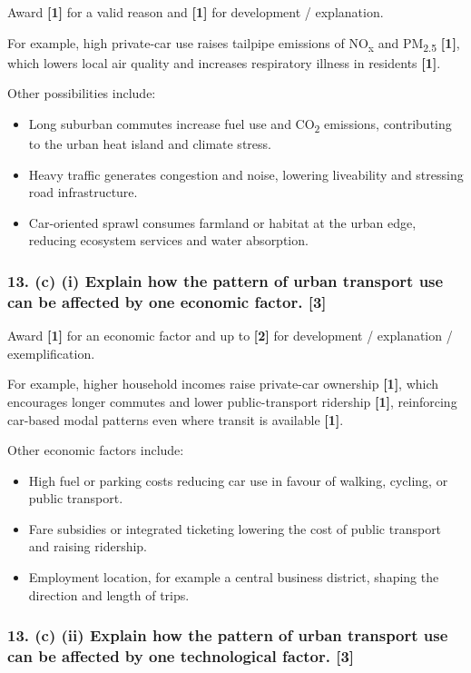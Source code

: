 \documentclass[11pt,a4paper]{article}
\newcommand{\term}[1]{\textbf{#1}}
\begin{document}
Award \term{[1]} for a valid reason and \term{[1]} for development /
explanation.

For example, high private-car use raises tailpipe emissions of
NO\textsubscript{x} and PM\textsubscript{2.5} \term{[1]}, which lowers local
air quality and increases respiratory illness in residents \term{[1]}.

Other possibilities include:
\begin{itemize}
  \item Long suburban commutes increase fuel use and CO\textsubscript{2}
  emissions, contributing to the urban heat island and climate stress.
  \item Heavy traffic generates congestion and noise, lowering liveability and
  stressing road infrastructure.
  \item Car-oriented sprawl consumes farmland or habitat at the urban edge,
  reducing ecosystem services and water absorption.
\end{itemize}

\subsubsection*{13. (c) (i) Explain how the pattern of urban transport use can be affected by one economic factor. \hfill[3]}

Award \term{[1]} for an economic factor and up to \term{[2]} for development
/ explanation / exemplification.

For example, higher household incomes raise private-car ownership \term{[1]},
which encourages longer commutes and lower public-transport ridership
\term{[1]}, reinforcing car-based modal patterns even where transit is
available \term{[1]}.

Other economic factors include:
\begin{itemize}
  \item High fuel or parking costs reducing car use in favour of walking,
  cycling, or public transport.
  \item Fare subsidies or integrated ticketing lowering the cost of public
  transport and raising ridership.
  \item Employment location, for example a central business district, shaping
  the direction and length of trips.
\end{itemize}

\subsubsection*{13. (c) (ii) Explain how the pattern of urban transport use can be affected by one technological factor. \hfill[3]}
\end{document}
